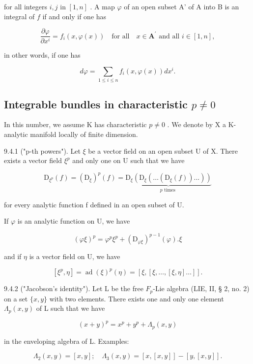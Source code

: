 for all integers \(i, j\) in \([1, n]\) . A map \(\varphi\) of an open subset A' of A into B is an integral of \(f\) if and only if one has

\[
\frac {\partial \varphi}{\partial x ^ {i}} = f _ {i} (x, \varphi (x)) \quad \text {for all} \quad x \in \mathbf {A} ^ {\prime} \text { and all } i \in [ 1, n ],
\]

in other words, if one has

\[
d \varphi = \sum_ {1 \leqslant i \leqslant n} f _ {i} (x, \varphi (x)) d x ^ {i}.
\]

\subsection{\texorpdfstring{Integrable bundles in characteristic \(p \neq 0\)}{Integrable bundles in characteristic p nonzero}}

In this number, we assume K has characteristic \(p \neq 0\) . We denote by X a K-analytic manifold locally of finite dimension.

9.4.1 ("p-th powers"). Let \(\xi\) be a vector field on an open subset U of X. There exists a vector field \(\xi^p\) and only one on U such that we have

\[
\mathrm{D} _ {\xi^ {p}} (f) = (\mathrm{D} _ {\xi}) ^ {p} (f) = \underbrace {\mathrm{D} _ {\xi} (\mathrm{D} _ {\xi} (\dots (\mathrm{D} _ {\xi} (f)) . . .))} _ {p \text { times }}\tag{1}
\]

for every analytic function f defined in an open subset of U.

If \(\varphi\) is an analytic function on U, we have

\[
(\varphi \xi) ^ {p} = \varphi^ {p} \xi^ {p} + (\mathrm{D} _ {\varphi \xi}) ^ {p - 1} (\varphi). \xi\tag{2}
\]

and if \(\eta\) is a vector field on U, we have

\[
[ \xi^ {p}, \eta ] = \operatorname{ad}(\xi) ^ {p} (\eta) = [ \xi , [ \xi , \dots , [ \xi , \eta ] \dots ] ].\tag{3}
\]

9.4.2 ("Jacobson's identity"). Let L be the free \(F_{p}\)-Lie algebra (LIE, II, § 2, no. 2) on a set \(\{x, y\}\) with two elements. There exists one and only one element \(\Lambda_{p}(x, y)\) of L such that we have

\[
(x + y) ^ {p} = x ^ {p} + y ^ {p} + \Lambda_ {p} (x, y)\tag{4}
\]

in the enveloping algebra of L. Examples:

\[
\Lambda_ {2} (x, y) = [ x, y ]; \quad \Lambda_ {3} (x, y) = [ x, [ x, y ] ] - [ y, [ x, y ] ].
\]

